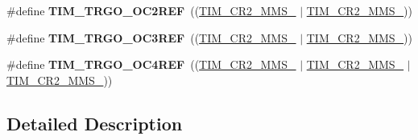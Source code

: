 \begin{DoxyCompactItemize}
\item 
\#define {\bfseries T\+I\+M\+\_\+\+T\+R\+G\+O\+\_\+\+O\+C2\+R\+EF}~((\hyperlink{group___peripheral___registers___bits___definition_gacb74a815afdd856d51cfcf1ddf3fce6a}{T\+I\+M\+\_\+\+C\+R2\+\_\+\+M\+M\+S\+\_} $\vert$ \hyperlink{group___peripheral___registers___bits___definition_gaf3e55308e84106d6501201e66bd46ab6}{T\+I\+M\+\_\+\+C\+R2\+\_\+\+M\+M\+S\+\_}))\hypertarget{group___t_i_m___master___mode___selection_gaaedc4b3f4c5c3c8b45a2cf1b73e33c0a}{}\label{group___t_i_m___master___mode___selection_gaaedc4b3f4c5c3c8b45a2cf1b73e33c0a}

\item 
\#define {\bfseries T\+I\+M\+\_\+\+T\+R\+G\+O\+\_\+\+O\+C3\+R\+EF}~((\hyperlink{group___peripheral___registers___bits___definition_gacb74a815afdd856d51cfcf1ddf3fce6a}{T\+I\+M\+\_\+\+C\+R2\+\_\+\+M\+M\+S\+\_} $\vert$ \hyperlink{group___peripheral___registers___bits___definition_ga4b1036929b0a4ba5bd5cced9b8e0f4c3}{T\+I\+M\+\_\+\+C\+R2\+\_\+\+M\+M\+S\+\_}))\hypertarget{group___t_i_m___master___mode___selection_ga4bc4791f8b9560950d30078b96d08f55}{}\label{group___t_i_m___master___mode___selection_ga4bc4791f8b9560950d30078b96d08f55}

\item 
\#define {\bfseries T\+I\+M\+\_\+\+T\+R\+G\+O\+\_\+\+O\+C4\+R\+EF}~((\hyperlink{group___peripheral___registers___bits___definition_gacb74a815afdd856d51cfcf1ddf3fce6a}{T\+I\+M\+\_\+\+C\+R2\+\_\+\+M\+M\+S\+\_} $\vert$ \hyperlink{group___peripheral___registers___bits___definition_ga4b1036929b0a4ba5bd5cced9b8e0f4c3}{T\+I\+M\+\_\+\+C\+R2\+\_\+\+M\+M\+S\+\_} $\vert$ \hyperlink{group___peripheral___registers___bits___definition_gaf3e55308e84106d6501201e66bd46ab6}{T\+I\+M\+\_\+\+C\+R2\+\_\+\+M\+M\+S\+\_}))\hypertarget{group___t_i_m___master___mode___selection_ga7fe6228adec5d1b6f0a8ed8da111db4d}{}\label{group___t_i_m___master___mode___selection_ga7fe6228adec5d1b6f0a8ed8da111db4d}

\end{DoxyCompactItemize}


\subsection{Detailed Description}
